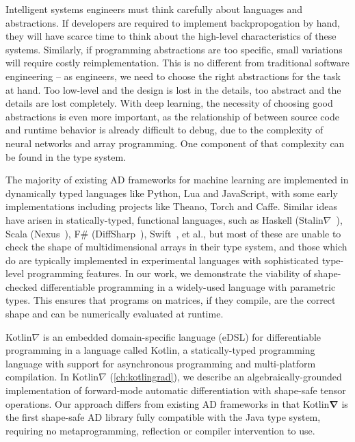 \documentclass[12pt,initial,twoside,maitrise]{dms}
\numberwithin{equation}{section}
\numberwithin{table}{chapter}
\numberwithin{figure}{chapter}
\begin{document}
Intelligent systems engineers must think carefully about languages and abstractions. If developers are required to implement backpropogation by hand, they will have scarce time to think about the high-level characteristics of these systems. Similarly, if programming abstractions are too specific, small variations will require costly reimplementation. This is no different from traditional software engineering -- as engineers, we need to choose the right abstractions for the task at hand. Too low-level and the design is lost in the details, too abstract and the details are lost completely. With deep learning, the necessity of choosing good abstractions is even more important, as the relationship of between source code and runtime behavior is already difficult to debug, due to the complexity of neural networks and array programming. One component of that complexity can be found in the type system.

The majority of existing AD frameworks for machine learning are implemented in dynamically typed languages like Python, Lua and JavaScript, with some early implementations including projects like Theano, Torch and Caffe. Similar ideas have arisen in statically-typed, functional languages, such as Haskell (Stalin$\nabla$~\citet{pearlmutter2008using}), Scala (Nexus~\citet{chen2017typesafe}), F\# (DiffSharp~\citet{baydin-diffsharp}), Swift~\citep{swift}, et al., but most of these are unable to check the shape of multidimensional arrays in their type system, and those which do are typically implemented in experimental languages with sophisticated type-level programming features. In our work, we demonstrate the viability of shape-checked differentiable programming in a widely-used language with parametric types. This ensures that programs on matrices, if they compile, are the correct shape and can be numerically evaluated at runtime.

Kotlin$\nabla$ is an embedded domain-specific language (eDSL) for differentiable programming in a language called Kotlin, a statically-typed programming language with support for asynchronous programming and multi-platform compilation. In Kotlin$\nabla$ (\autoref{ch:kotlingrad}), we describe an algebraically-grounded implementation of forward-mode automatic differentiation with shape-safe tensor operations. Our approach differs from existing AD frameworks in that Kotlin$\mathbf{\nabla}$ is the first shape-safe AD library fully compatible with the Java type system, requiring no metaprogramming, reflection or compiler intervention to use.
\end{document}
